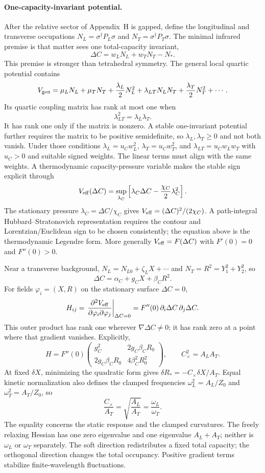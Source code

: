 \documentclass[11pt]{article}
\begin{document}
\paragraph{One-capacity-invariant potential.}
After the relative sector of Appendix~H is gapped, define the longitudinal and transverse occupations $N_L=\sigma^\dagger P_L\sigma$ and $N_T=\sigma^\dagger P_T\sigma$. The minimal infrared premise is that matter sees one total-capacity invariant,
\[
\Delta C=w_LN_L+w_TN_T-N_*.
\]
This premise is stronger than tetrahedral symmetry. The general local quartic potential contains
\[
V_{\rm gen}
=\mu_LN_L+\mu_TN_T
+\frac{\lambda_L}{2}N_L^2
+\lambda_{LT}N_LN_T
+\frac{\lambda_T}{2}N_T^2+\cdots .
\]
Its quartic coupling matrix has rank at most one when
\[
\lambda_{LT}^2=\lambda_L\lambda_T.
\]
It has rank one only if the matrix is nonzero. A stable one-invariant potential further requires the matrix to be positive semidefinite, so $\lambda_L,\lambda_T\ge0$ and not both vanish. Under those conditions $\lambda_L=u_Cw_L^2$, $\lambda_T=u_Cw_T^2$, and $\lambda_{LT}=u_Cw_Lw_T$ with $u_C>0$ and suitable signed weights. The linear terms must align with the same weights. A thermodynamic capacity-pressure variable makes the stable sign explicit through
\[
V_{\rm eff}(\Delta C)=\sup_{\lambda_C}
\left[\lambda_C\Delta C-\frac{\chi_C}{2}\lambda_C^2\right].
\]
The stationary pressure $\lambda_C=\Delta C/\chi_C$ gives $V_{\rm eff}=(\Delta C)^2/(2\chi_C)$. A path-integral Hubbard--Stratonovich representation requires the contour and Lorentzian/Euclidean sign to be chosen consistently; the equation above is the thermodynamic Legendre form. More generally $V_{\rm eff}=F(\Delta C)$ with $F'(0)=0$ and $F''(0)>0$.

Near a transverse background, $N_L=N_{L0}+\zeta_LX+\cdots$ and $N_T=R^2=Y_1^2+Y_2^2$, so
\[
\Delta C=\alpha_C+g_CX+\beta_C R^2.
\]
For fields $\varphi_i=(X,R)$ on the stationary surface $\Delta C=0$,
\[
H_{ij}=\left.\frac{\partial^2V_{\rm eff}}
{\partial\varphi_i\partial\varphi_j}\right|_{\Delta C=0}
=F''(0)\,\partial_i\Delta C\,\partial_j\Delta C.
\]
This outer product has rank one wherever $\nabla\Delta C\ne0$; it has rank zero at a point where that gradient vanishes. Explicitly,
\[
H=F''(0)
\begin{pmatrix}
g_C^2 & 2g_C\beta_C R_0\\
2g_C\beta_C R_0 & 4\beta_C^2R_0^2
\end{pmatrix},
\qquad
C_\times^2=A_LA_T.
\]
At fixed $\delta X$, minimizing the quadratic form gives $\delta R_*=-C_\times\delta X/A_T$. Equal kinetic normalization also defines the clamped frequencies $\omega_L^2=A_L/Z_0$ and $\omega_T^2=A_T/Z_0$, so
\[
\frac{C_\times}{A_T}=\sqrt{\frac{A_L}{A_T}}=\frac{\omega_L}{\omega_T}.
\]
The equality concerns the static response and the clamped curvatures. The freely relaxing Hessian has one zero eigenvalue and one eigenvalue $A_L+A_T$; neither is $\omega_L$ or $\omega_T$ separately.
The soft direction redistributes a fixed total capacity; the orthogonal direction changes the total occupancy. Positive gradient terms stabilize finite-wavelength fluctuations.
\end{document}
